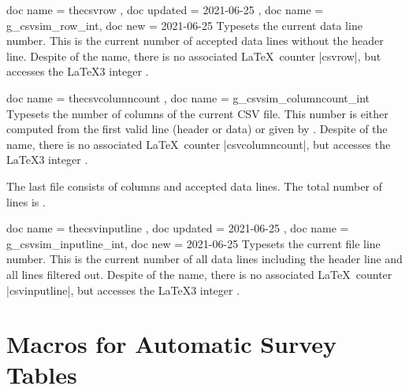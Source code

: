 \documentclass[a4paper,11pt]{ltxdoc}
\begin{document}
\begin{docCommands}{
    { doc name = thecsvrow       , doc updated = 2021-06-25 },
    { doc name = g_csvsim_row_int, doc new     = 2021-06-25 }
  }
  Typesets the current data line number. This is the
  current number of accepted data lines without the header line.
  Despite of the name, there is no associated \LaTeX\ counter |csvrow|,
  but  accesses the \LaTeX3 integer
  .
\end{docCommands}


\begin{docCommands}[doc new=2021-06-25]{
    { doc name = thecsvcolumncount },
    { doc name = g_csvsim_columncount_int }
  }
  Typesets the number of columns of the current CSV file. This number
  is either computed from the first valid line (header or data) or
  given by .
  Despite of the name, there is no associated \LaTeX\ counter |csvcolumncount|,
  but  accesses the \LaTeX3 integer
  .
\begin{dispExample}
%
The last file consists of \thecsvcolumncount{} columns and
\thecsvrow{} accepted data lines. The total number of lines
is \thecsvinputline{}.
\end{dispExample}
\end{docCommands}


\begin{docCommands}{
    { doc name = thecsvinputline       , doc updated = 2021-06-25 },
    { doc name = g_csvsim_inputline_int, doc new     = 2021-06-25 }
  }
  Typesets the current file line number. This is the
  current number of all data lines including the header line and all
  lines filtered out.
  Despite of the name, there is no associated \LaTeX\ counter |csvinputline|,
  but  accesses the \LaTeX3 integer
  .
\begin{dispExample}
\end{dispExample}
\end{docCommands}



\clearpage
\section{Macros for Automatic Survey Tables}\label{sec:autotable}%
\end{document}
